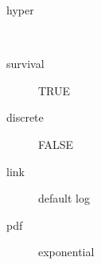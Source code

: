 \begin{description}
	\item[hyper]\ 
	\item[survival] TRUE
	\item[discrete] FALSE
	\item[link] default log
	\item[pdf] exponential
\end{description}
